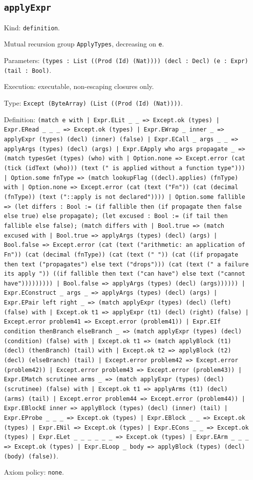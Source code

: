 \documentclass[11pt]{article}
\begin{document}
\subsection*{\texttt{applyExpr}}
\noindent Kind: \texttt{definition}.\par
\noindent Mutual recursion group \texttt{ApplyTypes}, decreasing on \texttt{e}.\par
\noindent Parameters: \texttt{(types : List ((Prod (Id) (Nat)))) (decl : Decl) (e : Expr) (tail : Bool)}.\par
\noindent Execution: executable, non-escaping closures only.\par
\noindent Type: \texttt{Except (ByteArray) (List ((Prod (Id) (Nat))))}.\par
\noindent Definition: \texttt{(match e with | Expr.ELit \_ \_ => Except.ok (types) | Expr.ERead \_ \_ \_ => Except.ok (types) | Expr.EWrap \_ inner \_ => applyExpr (types) (decl) (inner) (false) | Expr.ECall \_ args \_ \_ => applyArgs (types) (decl) (args) | Expr.EApply who args propagate \_ => (match typesGet (types) (who) with | Option.none => Except.error (cat (tick (idText (who))) (text (" is applied without a function type"))) | Option.some fnType => (match lookupFlag ((decl).applies) (fnType) with | Option.none => Except.error (cat (text ("Fn")) (cat (decimal (fnType)) (text ("::apply is not declared")))) | Option.some fallible => (let differs : Bool := (if fallible then (if propagate then false else true) else propagate); (let excused : Bool := (if tail then fallible else false); (match differs with | Bool.true => (match excused with | Bool.true => applyArgs (types) (decl) (args) | Bool.false => Except.error (cat (text ("arithmetic: an application of Fn")) (cat (decimal (fnType)) (cat (text (" ")) (cat ((if propagate then text ("propagates") else text ("drops"))) (cat (text (" a failure its apply ")) ((if fallible then text ("can have") else text ("cannot have"))))))))) | Bool.false => applyArgs (types) (decl) (args)))))) | Expr.EConstruct \_ args \_ => applyArgs (types) (decl) (args) | Expr.EPair left right \_ => (match applyExpr (types) (decl) (left) (false) with | Except.ok t1 => applyExpr (t1) (decl) (right) (false) | Except.error problem41 => Except.error (problem41)) | Expr.EIf condition thenBranch elseBranch \_ => (match applyExpr (types) (decl) (condition) (false) with | Except.ok t1 => (match applyBlock (t1) (decl) (thenBranch) (tail) with | Except.ok t2 => applyBlock (t2) (decl) (elseBranch) (tail) | Except.error problem42 => Except.error (problem42)) | Except.error problem43 => Except.error (problem43)) | Expr.EMatch scrutinee arms \_ => (match applyExpr (types) (decl) (scrutinee) (false) with | Except.ok t1 => applyArms (t1) (decl) (arms) (tail) | Except.error problem44 => Except.error (problem44)) | Expr.EBlockE inner => applyBlock (types) (decl) (inner) (tail) | Expr.EProbe \_ \_ \_ => Except.ok (types) | Expr.EBlock \_ \_ => Except.ok (types) | Expr.ENil => Except.ok (types) | Expr.ECons \_ \_ => Except.ok (types) | Expr.ELet \_ \_ \_ \_ \_ \_ => Except.ok (types) | Expr.EArm \_ \_ \_ => Except.ok (types) | Expr.ELoop \_ body => applyBlock (types) (decl) (body) (false))}.\par
\noindent Axiom policy: \texttt{none}.\par
\end{document}
